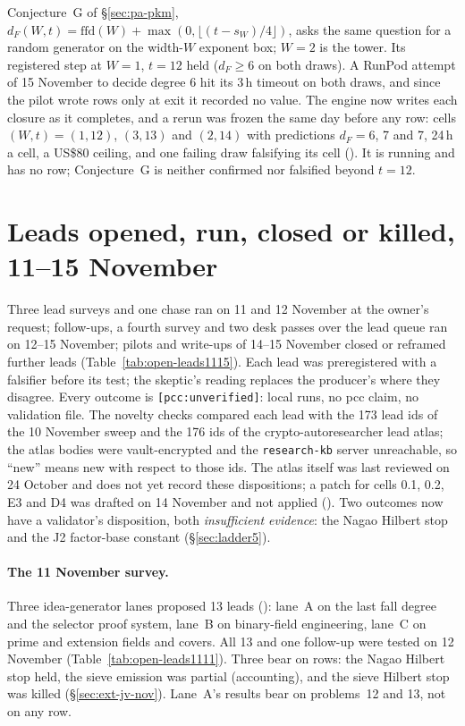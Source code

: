 Conjecture~G of \S\ref{sec:pa-pkm},
$d_F(W,t)=\mathrm{ffd}(W)+\max(0,\lfloor(t-s_W)/4\rfloor)$, asks the same
question for a random generator on the width-$W$ exponent box; $W=2$ is the
tower. Its registered step at $W=1$, $t=12$ held ($d_F\ge6$ on both draws).
A RunPod attempt of 15 November to decide degree 6 hit its 3\,h timeout on
both draws, and since the pilot wrote rows only at exit it recorded no
value. The engine now writes each closure as it completes, and a rerun
was frozen the same day before any row: cells $(W,t)=(1,12)$, $(3,13)$ and
$(2,14)$ with predictions $d_F=6$, 7 and 7, 24\,h a cell, a US\$80 ceiling,
and one failing draw falsifying its cell
().
It is running and has no row; Conjecture~G is neither confirmed nor
falsified beyond $t=12$.

\section{Leads opened, run, closed or killed, 11--15 November}\label{sec:open-leads}

Three lead surveys and one chase ran on 11 and 12 November at the owner's
request; follow-ups, a fourth survey and two desk passes over the lead
queue ran on 12--15 November; pilots and write-ups of 14--15 November
closed or reframed further leads (Table~\ref{tab:open-leads1115}). Each
lead was preregistered with a falsifier before its test; the
skeptic's reading replaces the producer's where they disagree. Every
outcome is \texttt{[pcc:unverified]}: local runs, no pcc claim, no
validation file. The novelty checks compared each lead with the 173 lead
ids of the 10 November sweep and the 176 ids of the crypto-autoresearcher
lead atlas; the atlas bodies were vault-encrypted and the
\texttt{research-kb} server unreachable, so ``new'' means new with respect
to those ids. The atlas itself was last reviewed on 24 October and does
not yet record these dispositions; a patch for cells 0.1, 0.2, E3 and D4
was drafted on 14 November and not applied
().
Two outcomes now have a validator's disposition, both \emph{insufficient
evidence}: the Nagao Hilbert stop and the J2 factor-base constant
(\S\ref{sec:ladder5}).

\paragraph{The 11 November survey.} Three idea-generator lanes proposed 13
leads (): lane~A on the last fall
degree and the selector proof system, lane~B on binary-field engineering,
lane~C on prime and extension fields and covers. All 13 and one follow-up
were tested on 12 November (Table~\ref{tab:open-leads1111}). Three bear on
rows: the Nagao Hilbert stop held, the sieve emission was partial
(accounting), and the sieve Hilbert stop was killed
(\S\ref{sec:ext-jv-nov}). Lane~A's results bear on problems~12 and 13, not
on any row.

